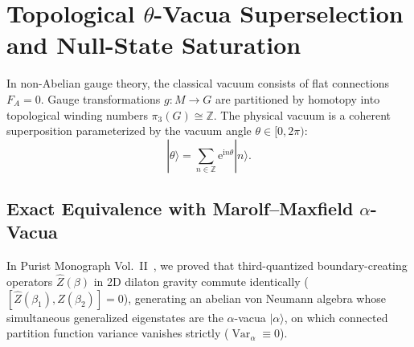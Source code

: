 \documentclass[11pt,a4paper,reqno]{article}
\theoremstyle{plain}
\theoremstyle{definition}
\theoremstyle{remark}
\numberwithin{equation}{section}
\DeclareMathOperator{\Var}{Var}
\begin{document}
\section{Topological \texorpdfstring{$\theta$}{theta}-Vacua Superselection and Null-State Saturation}
\label{sec:theta_vacua_superselection}

In non-Abelian gauge theory, the classical vacuum consists of flat connections $F_A = 0$. Gauge transformations $g: M \to G$ are partitioned by homotopy into topological winding numbers $\pi_3(G) \cong \mathbb{Z}$. The physical vacuum is a coherent superposition parameterized by the vacuum angle $\theta \in [0, 2\pi)$:
\begin{equation}
  |\theta\rangle = \sum_{n \in \mathbb{Z}} \mathrm{e}^{\mathrm{i} n \theta} |n\rangle.
  \label{eq:theta_vacuum_def}
\end{equation}

\subsection{Exact Equivalence with Marolf--Maxfield \texorpdfstring{$\alpha$}{alpha}-Vacua}
\label{subsec:theta_alpha_equivalence}

In Purist Monograph Vol.~II~\cite{PuristVol2Monograph2026}, we proved that third-quantized boundary-creating operators $\widehat{Z}(\beta)$ in 2D dilaton gravity commute identically ($[\widehat{Z}(\beta_1), \widehat{Z}(\beta_2)] = 0$), generating an abelian von Neumann algebra whose simultaneous generalized eigenstates are the $\alpha$-vacua $|\alpha\rangle$, on which connected partition function variance vanishes strictly ($\Var_\alpha \equiv 0$).
\end{document}
